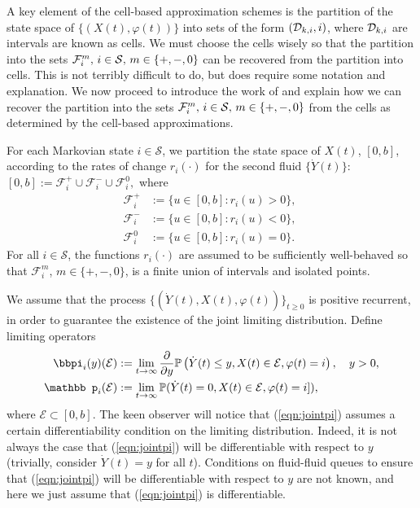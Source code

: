 A key element of the cell-based approximation schemes is the partition of the state space of \(\{(X(t),\varphi(t))\}\) into sets of the form \((\mathcal{D}_{k,i},i)\), where \(\mathcal{D}_{k,i}\) are intervals are known as cells. We must choose the cells wisely so that the partition into the sets \(\mathcal F_i^m,\, i\in\mathcal{S},\,m\in\{+,-,0\}\) can be recovered from the partition into cells. This is not terribly difficult to do, but does require some notation and explanation. We now proceed to introduce the work of \cite{bo2014} and explain how we can recover the partition into the sets \(\mathcal F_i^m,\, i\in\mathcal{S},\,m\in\{+,-,0\}\) from the cells as determined by the cell-based approximations.

For each Markovian state $i \in \mathcal{S}$, we partition the state space of \( X(t)\), \([0,b]\), according to the rates of change $r_i(\cdot)$ for the second fluid $\{\dot Y(t)\}$: $[0,b] := \mathcal{F}^{+}_i \cup \mathcal{F}^{-}_i \cup \mathcal{F}^{0}_i,$  
where 
% 
		\begin{align} 
			\mathcal{F}^{+}_i & := \{u \in [0,b] : r_i(u) > 0\},  \; \nonumber
			\\\mathcal{F}^{-}_i &:=  \{u \in [0,b]:  r_i(u) < 0\}, \; \nonumber
			\\\mathcal{F}^{0}_i &:= \{u \in [0,b]: r_i(u) = 0\}.\label{eqn:fil}
		\end{align} 
% 
For all $i \in \mathcal{S}$, the functions $r_i(\cdot)$ are assumed to be sufficiently well-behaved so that $\mathcal{F}^{m}_i$, $m \in \{+, -, 0\}$, is a finite union of intervals and isolated points. 

We assume that the process $\{(\dot Y(t), X(t), \varphi(t))\}_{t\geq 0}$ is positive recurrent, in order to guarantee the existence of the joint limiting distribution. Define limiting operators 
\begin{align} 
		\label{eqn:jointpi} 
		\bbpi_i(y)(\mathcal{E}) & := \lim_{t \rightarrow \infty} \frac{\partial}{\partial y} \mathbb{P}\left( \dot Y(t) \leq y,  X(t) \in \mathcal{E}, \varphi(t) = i\right), \quad y>0,\\
% 
		\label{eqn:jointmass}
		{\mathbb p}_i(\mathcal{E}) & := \lim_{t \rightarrow \infty}  \mathbb{P}( \dot Y(t) = 0,  X(t) \in \mathcal{E}, \varphi(t) = i]),
\end{align} 
where $\mathcal{E} \subset [0,b]$. The keen observer will notice that (\ref{eqn:jointpi}) assumes a certain differentiability condition on the limiting distribution. Indeed, it is not always the case that (\ref{eqn:jointpi}) will be differentiable with respect to \(y\) (trivially, consider \(\dot Y(t)=y\) for all \(t\)). Conditions on fluid-fluid queues to ensure that (\ref{eqn:jointpi}) will be differentiable with respect to \(y\) are not known, and here we just assume that (\ref{eqn:jointpi}) is differentiable. 

